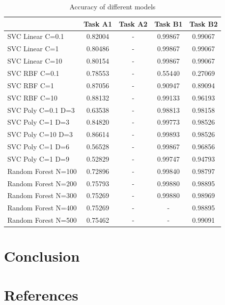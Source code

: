 \documentclass[a4paper,11pt]{article}
\begin{document}
\begin{table}[h!]
	\begin{center}
		\begin{tabular}{l|c|c|c|c} 
			& \textbf{Task A1} & \textbf{Task A2} & \textbf{Task B1} & \textbf{Task B2}\\
			\hline
SVC Linear C=0.1    & 0.82004 & - & 0.99867 & 0.99067 \\
SVC Linear C=1      & 0.80486 & - & 0.99867 & 0.99067 \\
SVC Linear C=10     & 0.80154 & - & 0.99867 & 0.99067 \\
SVC RBF C=0.1       & 0.78553 & - & 0.55440 & 0.27069 \\
SVC RBF C=1         & 0.87056 & - & 0.90947 & 0.89094 \\
SVC RBF C=10        & 0.88132 & - & 0.99133 & 0.96193 \\
SVC Poly C=0.1 D=3  & 0.63538 & - & 0.98813 & 0.98158 \\
SVC Poly C=1 D=3    & 0.84820 & - & 0.99773 & 0.98526 \\
SVC Poly C=10 D=3   & 0.86614 & - & 0.99893 & 0.98526 \\
SVC Poly C=1 D=6    & 0.56528 & - & 0.99867 & 0.96856 \\
SVC Poly C=1 D=9    & 0.52829 & - & 0.99747 & 0.94793 \\
Random Forest N=100 & 0.72896 & - & 0.99840 & 0.98797 \\
Random Forest N=200 & 0.75793 & - & 0.99880 & 0.98895 \\
Random Forest N=300 & 0.75269 & - & 0.99880 & 0.98969 \\
Random Forest N=400 & 0.75269 & - & - & 0.98895  \\
Random Forest N=500 & 0.75462 & - & - & 0.99091  \\
		\end{tabular}
		\caption{Accuracy of different models}
		\label{tab:table1}
	\end{center}
\end{table}


\section{Conclusion}

\section{References}
\end{document}
